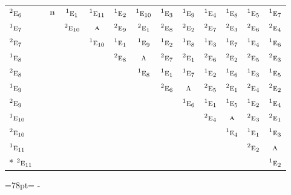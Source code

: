 \documentclass[10pt,a4paper]{article}
\newcommand{\needspace}[1]{\par\penalty-100\begingroup\dimen0=#1\relax\dimen2=\pagegoal
  \advance\dimen2-\pagetotal\ifdim\dimen0>\dimen2\relax\ifdim\dimen2>0pt\vfil\break\fi\fi
  \endgroup}
\numberwithin{equation}{section}
\newcommand{\irr}[1]{\text{\normalfont\scshape #1}}
\newcommand{\conjpair}[1]{{}^{#1}}
\begin{document}
{\begin{longtable}{@{}lcccccccccccc@{}}
$\conjpair{2}\irr{e}_{6}$ &  & $\irr{b}$ & $\conjpair{1}\irr{e}_{1}$ & $\conjpair{1}\irr{e}_{11}$ & $\conjpair{1}\irr{e}_{2}$ & $\conjpair{1}\irr{e}_{10}$ & $\conjpair{1}\irr{e}_{3}$ & $\conjpair{1}\irr{e}_{9}$ & $\conjpair{1}\irr{e}_{4}$ & $\conjpair{1}\irr{e}_{8}$ & $\conjpair{1}\irr{e}_{5}$ & $\conjpair{1}\irr{e}_{7}$\\
$\conjpair{1}\irr{e}_{7}$ &  &  & $\conjpair{2}\irr{e}_{10}$ & $\irr{a}$ & $\conjpair{2}\irr{e}_{9}$ & $\conjpair{2}\irr{e}_{1}$ & $\conjpair{2}\irr{e}_{8}$ & $\conjpair{2}\irr{e}_{2}$ & $\conjpair{2}\irr{e}_{7}$ & $\conjpair{2}\irr{e}_{3}$ & $\conjpair{2}\irr{e}_{6}$ & $\conjpair{2}\irr{e}_{4}$\\
$\conjpair{2}\irr{e}_{7}$ &  &  &  & $\conjpair{1}\irr{e}_{10}$ & $\conjpair{1}\irr{e}_{1}$ & $\conjpair{1}\irr{e}_{9}$ & $\conjpair{1}\irr{e}_{2}$ & $\conjpair{1}\irr{e}_{8}$ & $\conjpair{1}\irr{e}_{3}$ & $\conjpair{1}\irr{e}_{7}$ & $\conjpair{1}\irr{e}_{4}$ & $\conjpair{1}\irr{e}_{6}$\\
$\conjpair{1}\irr{e}_{8}$ &  &  &  &  & $\conjpair{2}\irr{e}_{8}$ & $\irr{a}$ & $\conjpair{2}\irr{e}_{7}$ & $\conjpair{2}\irr{e}_{1}$ & $\conjpair{2}\irr{e}_{6}$ & $\conjpair{2}\irr{e}_{2}$ & $\conjpair{2}\irr{e}_{5}$ & $\conjpair{2}\irr{e}_{3}$\\
$\conjpair{2}\irr{e}_{8}$ &  &  &  &  &  & $\conjpair{1}\irr{e}_{8}$ & $\conjpair{1}\irr{e}_{1}$ & $\conjpair{1}\irr{e}_{7}$ & $\conjpair{1}\irr{e}_{2}$ & $\conjpair{1}\irr{e}_{6}$ & $\conjpair{1}\irr{e}_{3}$ & $\conjpair{1}\irr{e}_{5}$\\
$\conjpair{1}\irr{e}_{9}$ &  &  &  &  &  &  & $\conjpair{2}\irr{e}_{6}$ & $\irr{a}$ & $\conjpair{2}\irr{e}_{5}$ & $\conjpair{2}\irr{e}_{1}$ & $\conjpair{2}\irr{e}_{4}$ & $\conjpair{2}\irr{e}_{2}$\\
$\conjpair{2}\irr{e}_{9}$ &  &  &  &  &  &  &  & $\conjpair{1}\irr{e}_{6}$ & $\conjpair{1}\irr{e}_{1}$ & $\conjpair{1}\irr{e}_{5}$ & $\conjpair{1}\irr{e}_{2}$ & $\conjpair{1}\irr{e}_{4}$\\
$\conjpair{1}\irr{e}_{10}$ &  &  &  &  &  &  &  &  & $\conjpair{2}\irr{e}_{4}$ & $\irr{a}$ & $\conjpair{2}\irr{e}_{3}$ & $\conjpair{2}\irr{e}_{1}$\\
$\conjpair{2}\irr{e}_{10}$ &  &  &  &  &  &  &  &  &  & $\conjpair{1}\irr{e}_{4}$ & $\conjpair{1}\irr{e}_{1}$ & $\conjpair{1}\irr{e}_{3}$\\
$\conjpair{1}\irr{e}_{11}$ &  &  &  &  &  &  &  &  &  &  & $\conjpair{2}\irr{e}_{2}$ & $\irr{a}$\\*
$\conjpair{2}\irr{e}_{11}$ &  &  &  &  &  &  &  &  &  &  &  & $\conjpair{1}\irr{e}_{2}$\\
\bottomrule\end{longtable}}
\needspace{78pt}
\end{document}
